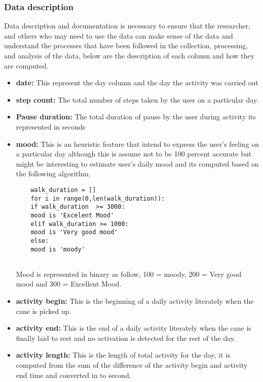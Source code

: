\documentclass[a4paper, parskip=full]{scrartcl}
\begin{document}
\subsubsection*{Data description}

Data description and documentation is necessary to ensure that the researcher, and others who may need to use the data can make sense of the data and understand the processes that have been followed in the collection, processing, and analysis of the data, below are the description of each column and how they are computed.

\begin{itemize}
	\item  \textbf{ date:} This represent the day column and the day the activity was carried out
	
	
	\item   \textbf{step count:} The total number of steps taken by the user on a particular day.
	
	\item \textbf{Pause duration:} The total duration of pause by the user during activity its represented in seconds
	
	\item \textbf{mood:} This is an heuristic feature that intend to express the user's feeling on a particular day although this is assume not to be 100 percent accurate but might be interesting to estimate user's daily mood and its computed based on the following algorithm,
	
	\begin{lstlisting}
	walk_duration = []
	for i in range(0,len(walk_duration)):
	if walk_duration  >= 3000:
	mood is 'Excelent Mood'
	elif walk_duration >= 1000:
	mood is 'Very good mood'
	else:
	mood is 'moody'
	
	\end{lstlisting}
	
	Mood is represented in binary as follow, 100 = moody, 200 = Very good mood	and 300 = Excellent Mood.
	
	\item \textbf{activity begin:} This is the beginning of a daily activity literately when the cane is picked up.
	
	\item \textbf{activity end:} This is the end of a daily activity literately when the cane is finally laid to rest and no activation is detected for the rest of the day.
	
	\item \textbf{activity length:} This is the length of total activity for the day, it is computed from the sum of the difference of the activity begin and activity end time and converted in to second.
	

\end{itemize}
\end{document}
